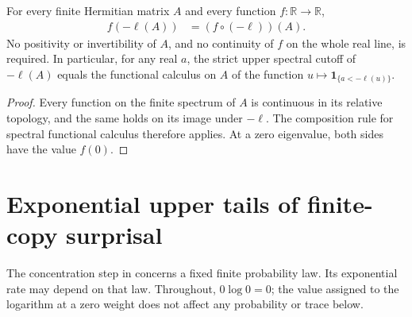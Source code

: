 \begin{theorem}
    \label{thm:surprisal_functional_calculus}
    \leanok
    For every finite Hermitian matrix $A$ and every function
    $f:\mathbb R\to\mathbb R$,
    \begin{align*}
        f(-\ell(A)) & =(f\circ(-\ell))(A).
    \end{align*}
    No positivity or invertibility of $A$, and no continuity of $f$ on the
    whole real line, is required. In particular, for any real $a$, the strict
    upper spectral cutoff of $-\ell(A)$ equals the functional calculus on
    $A$ of the function $u\mapsto\mathbf1_{\{a<-\ell(u)\}}$.
\end{theorem}
\begin{proof}\leanok
    Every function on the finite spectrum of $A$ is continuous in its
    relative topology, and the same holds on its image under $-\ell$.
    The composition rule for spectral functional calculus therefore applies.
    At a zero eigenvalue, both sides have the value $f(0)$.
\end{proof}

\section{Exponential upper tails of finite-copy surprisal}
\label{sec:iid_surprisal_exponential}

The concentration step in \cite[Section~7]{OpenAI2026AreaLaw} concerns a
fixed finite probability law. Its exponential rate may depend on that law.
Throughout, $0\log 0=0$; the value assigned to the logarithm at a zero
weight does not affect any probability or trace below.

